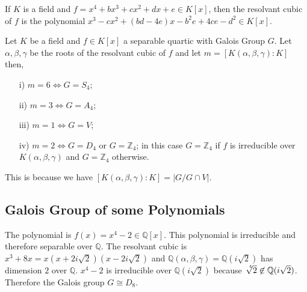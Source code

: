 \begin{remark} \cite{hunger} If \(K\) is a field and \(f = x^4+bx^3+cx^2+dx+e \in K[x]\), then the resolvant cubic of \(f\) is the polynomial \(x^3-cx^2+(bd-4e)x-b^2e+4ce-d^2 \in K[x]\).
\end{remark}
\clearpage

\begin{tcolorbox}[boxsep=-1mm]
\begin{theorem} \cite{hunger}
  Let \(K\) be a field and \(f \in K[x]\) a separable quartic with Galois Group \(G\). Let \(\alpha, \beta, \gamma\) be the roots of the resolvant cubic of \(f\) and let \(m= [K(\alpha, \beta, \gamma) : K]\) then,
\begin{enumerate}
\item[i)] \(m=6 \Longleftrightarrow G=S_4\);
\item[ii)] \(m=3 \Longleftrightarrow G=A_4\);
\item[iii)] \(m=1 \Longleftrightarrow G=V\);
\item[iv)] \(m=2 \Longleftrightarrow G=D_4\) or \(G={\mathbb{Z}}_4\); in this case \(G={\mathbb{Z}}_4\) if \(f\) is irreducible over \(K(\alpha, \beta, \gamma)\) and \(G={\mathbb{Z}}_4\) otherwise.
\end{enumerate}
\end{theorem}
\end{tcolorbox}
This is because we have \([K(\alpha,\beta,\gamma):K] = |G/G \cap V|\).

\subsection{Galois Group of some Polynomials}
\begin{example} \cite{hunger}
The polynomial is \(f(x)=x^4-2 \in \mathbb{Q}[x]\). This polynomial is irreducible and therefore separable over \(\mathbb{Q}\). The resolvant cubic is \(x^3+8x = x(x+2i\sqrt{2})(x-2i\sqrt{2})\) and \(\mathbb{Q}(\alpha,\beta, \gamma)=\mathbb{Q}(i\sqrt{2})\) has dimension \(2\) over \(\mathbb{Q}\). \(x^4-2\) is irreducible over \(\mathbb{Q}(i\sqrt{2})\) because \(\sqrt[\leftroot{-3}\uproot{3}4]{2} \not\in \mathbb{Q}(i\sqrt{2})\). Therefore the Galois group \(G \cong D_8\).
\end{example}

